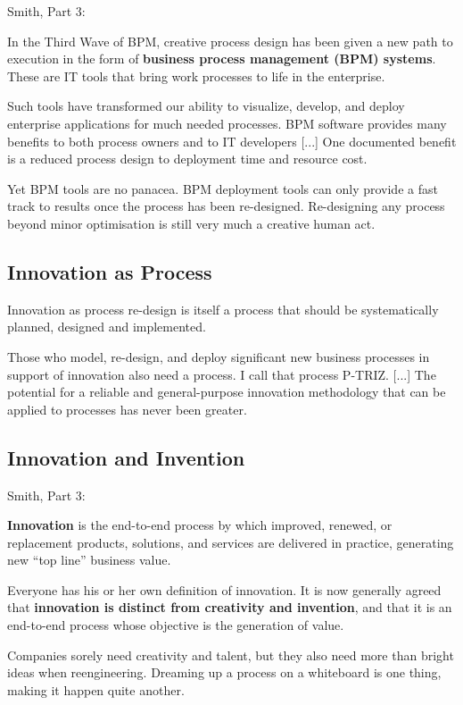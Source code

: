 \documentclass[11pt,a4paper]{article}
\begin{document}
Smith, Part 3:

In the Third Wave of BPM, creative process design has been given a new path to
execution in the form of \textbf{business process management (BPM)
  systems}. These are IT tools that bring work processes to life in the
enterprise.

Such tools have transformed our ability to visualize, develop, and deploy
enterprise applications for much needed processes. BPM software provides many
benefits to both process owners and to IT developers [...] One documented
benefit is a reduced process design to deployment time and resource cost.

Yet BPM tools are no panacea. BPM deployment tools can only provide a fast
track to results once the process has been re-designed. Re-designing any
process beyond minor optimisation is still very much a creative human act.

\subsection{Innovation as Process}
Innovation as process re-design is itself a process that should be
systematically planned, designed and implemented.

Those who model, re-design, and deploy significant new business processes in
support of innovation also need a process. I call that process P-TRIZ.  [...]
The potential for a reliable and general-purpose innovation methodology that
can be applied to processes has never been greater.

\subsection{Innovation and Invention}

Smith, Part 3:

\textbf{Innovation} is the end-to-end process by which improved, renewed, or
replacement products, solutions, and services are delivered in practice,
generating new “top line” business value.

Everyone has his or her own definition of innovation. It is now generally
agreed that \textbf{innovation is distinct from creativity and invention}, and
that it is an end-to-end process whose objective is the generation of value.

Companies sorely need creativity and talent, but they also need more than
bright ideas when reengineering. Dreaming up a process on a whiteboard is one
thing, making it happen quite another.
\end{document}
